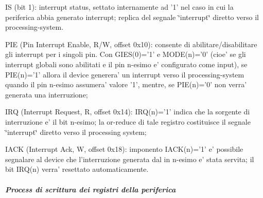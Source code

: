 \begin{DoxyItemize}
\begin{DoxyItemize}
\item I\+S (bit 1)\+: interrupt status, settato internamente ad '1' nel caso in cui la periferica abbia generato interrupt; replica del segnale \char`\"{}interrupt\char`\"{} diretto verso il processing-\/system.
\end{DoxyItemize}
\item P\+I\+E (Pin Interrupt Enable, R/\+W, offset 0x10)\+: consente di abilitare/disabilitare gli interrupt per i singoli pin. Con G\+I\+E\+S(0)='1' e M\+O\+D\+E(n)='0' (cioe' se gli interrupt globali sono abilitati e il pin n-\/esimo e' configurato come input), se P\+I\+E(n)='1' allora il device generera' un interrupt verso il processing-\/system quando il pin n-\/esimo assumera' valore '1', mentre, se P\+I\+E(n)='0' non verra' generata una interruzione;
\item I\+R\+Q (Interrupt Request, R, offset 0x14)\+: I\+R\+Q(n)='1' indica che la sorgente di interruzione e' il bit n-\/esimo; la or-\/reduce di tale registro costituisce il segnale \char`\"{}interrupt\char`\"{} diretto verso il processing system;
\item I\+A\+C\+K (Interrupt Ack, W, offset 0x18)\+: imponento I\+A\+C\+K(n)='1' e' possibile segnalare al device che l'interruzione generata dal in n-\/esimo e' stata servita; il bit I\+R\+Q(n) verra' resettato automaticamente.
\end{DoxyItemize}

\subparagraph*{Process di scrittura dei registri della periferica}

